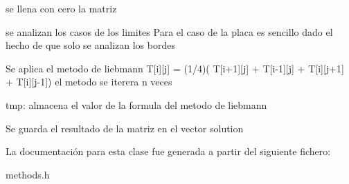 se llena con cero la matriz

se analizan los casos de los limites Para el caso de la placa es sencillo dado el hecho de que solo se analizan los bordes

Se aplica el metodo de liebmann T\mbox{[}i\mbox{]}\mbox{[}j\mbox{]} = (1/4)( T\mbox{[}i+1\mbox{]}\mbox{[}j\mbox{]} + T\mbox{[}i-\/1\mbox{]}\mbox{[}j\mbox{]} + T\mbox{[}i\mbox{]}\mbox{[}j+1\mbox{]} + T\mbox{[}i\mbox{]}\mbox{[}j-\/1\mbox{]}) el metodo se iterera n veces

tmp\+: almacena el valor de la formula del metodo de liebmann

Se guarda el resultado de la matriz en el vector solution

La documentación para esta clase fue generada a partir del siguiente fichero\+:\begin{DoxyCompactItemize}
\item 
methods.\+h\end{DoxyCompactItemize}
